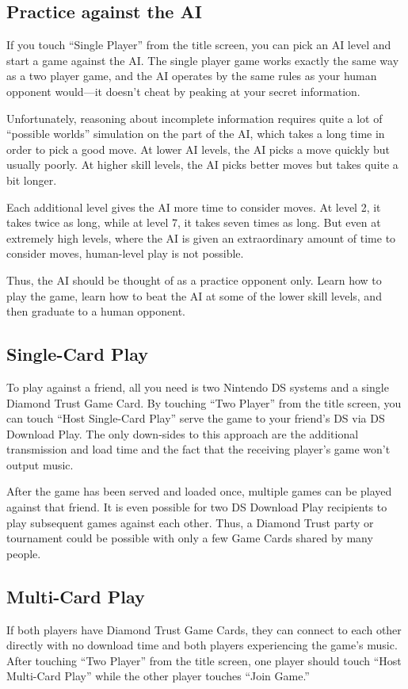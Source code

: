 \documentclass[8pt]{extbook}
\begin{document}
\subsection{Practice against the AI}

If you touch ``Single Player'' from the title screen, you can pick an AI level and start a game against the AI.  The single player game works exactly the same way as a two player game, and the AI operates by the same rules as your human opponent would---it doesn't cheat by peaking at your secret information.

Unfortunately, reasoning about incomplete information requires quite a lot of ``possible worlds'' simulation on the part of the AI, which takes a long time in order to pick a good move.  At lower AI levels, the AI picks a move quickly but usually poorly.  At higher skill levels, the AI picks better moves but takes quite a bit longer.

Each additional level gives the AI more time to consider moves.  At level 2, it takes twice as long, while at level 7, it takes seven times as long.  But even at extremely high levels, where the AI is given an extraordinary amount of time to consider moves, human-level play is not possible.

Thus, the AI should be thought of as a practice opponent only.  Learn how to play the game, learn how to beat the AI at some of the lower skill levels, and then graduate to a human opponent.  

\subsection{Single-Card Play}
\label{sec:singleCard}
To play against a friend, all you need is two Nintendo DS systems and a single Diamond Trust Game Card.  By touching ``Two Player'' from the title screen, you can touch ``Host Single-Card Play'' serve the game to your friend's DS via DS Download Play.  The only down-sides to this approach are the additional transmission and load time and the fact that the receiving player's game won't output music.

After the game has been served and loaded once, multiple games can be played against that friend.  It is even possible for two DS Download Play recipients to play subsequent games against each other.  Thus, a Diamond Trust party or tournament could be possible with only a few Game Cards shared by many people.
 

\subsection{Multi-Card Play}
If both players have Diamond Trust Game Cards, they can connect to each other directly with no download time and both players experiencing the game's music.  After touching ``Two Player'' from the title screen, one player should touch ``Host Multi-Card Play'' while the other player touches ``Join Game.''
\end{document}
